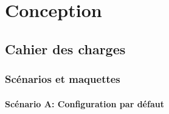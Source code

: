 \documentclass[17pts]{report}
\begin{document}
\chapter{Conception}
\label{cha:Conception}
    \section{Cahier des charges}
    \label{sec:Cahier des charges}
        \subsection{Scénarios et maquettes}
        \label{sub:Scénarios et maquettes}

\subsubsection{Scénario A: Configuration par défaut}
\label{sssub:Scénario A: Configuration par défaut}
\end{document}
